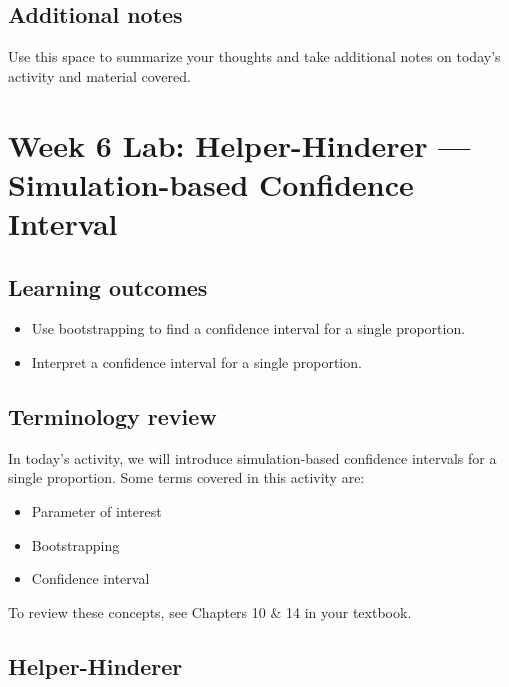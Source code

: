 \documentclass[
]{report}
\begin{document}
\hypertarget{additional-notes-1}{%
\subsection{Additional notes}\label{additional-notes-1}}

Use this space to summarize your thoughts and take additional notes on today's activity and material covered.

\newpage

\hypertarget{week-6-lab-helper-hinderer-simulation-based-confidence-interval}{%
\section{Week 6 Lab: Helper-Hinderer --- Simulation-based Confidence Interval}\label{week-6-lab-helper-hinderer-simulation-based-confidence-interval}}


\hypertarget{learning-outcomes-2}{%
\subsection{Learning outcomes}\label{learning-outcomes-2}}

\begin{itemize}
\item
  Use bootstrapping to find a confidence interval for a single proportion.
\item
  Interpret a confidence interval for a single proportion.
\end{itemize}

\hypertarget{terminology-review-1}{%
\subsection{Terminology review}\label{terminology-review-1}}

In today's activity, we will introduce simulation-based confidence intervals for a single proportion. Some terms covered in this activity are:

\begin{itemize}
\item
  Parameter of interest
\item
  Bootstrapping
\item
  Confidence interval
\end{itemize}

To review these concepts, see Chapters 10 \& 14 in your textbook.

\hypertarget{helper-hinderer-2}{%
\subsection{Helper-Hinderer}\label{helper-hinderer-2}}
\end{document}
